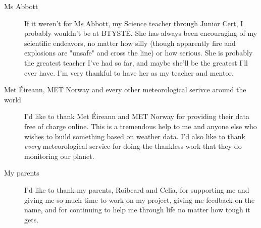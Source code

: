 \begin{description}
	\item[Ms Abbott] If it weren't for Ms Abbott, my Science teacher through Junior Cert, I probably wouldn't be at BTYSTE. She has always been encouraging of my scientific endeavors, no matter how silly (though apparently fire and explosions are "unsafe" and cross the line) or how serious. She is probably the greatest teacher I've had so far, and maybe she'll be the greatest I'll ever have. I'm very thankful to have her as my teacher and mentor.
	
	\item[Met Éireann, MET Norway and every other meteorological serivce around the world] I'd like to thank Met Éireann and MET Norway for providing their data free of charge online. This is a tremendous help to me and anyone else who wishes to build something based on weather data. I'd also like to thank \textit{every} meteorological service for doing the thankless work that they do monitoring our planet.
	
	\item[My parents] I'd like to thank my parents, Roibeard and Celia, for supporting me and giving me so much time to work on my project, giving me feedback on the name, and for continuing to help me through life no matter how tough it gets.
\end{description}
